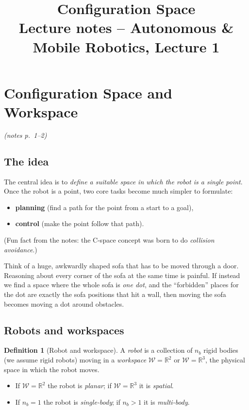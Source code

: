 \documentclass[11pt,a4paper]{article}
\title{\textbf{Configuration Space}\\[2pt]\large Lecture notes -- Autonomous \& Mobile Robotics, Lecture 1}
\author{}
\date{}
\newcommand{\R}{\mathbb{R}}
\newcommand{\W}{\mathcal{W}}
\newcommand{\pts}[1]{\emph{(notes p.~#1)}}
\theoremstyle{definition}
\newtheorem{definition}{Definition}[section]
\theoremstyle{plain}
\begin{document}
\maketitle
\tableofcontents
\bigskip


\section{Configuration Space and Workspace}\pts{1--2}

\subsection{The idea}

The central idea is to \emph{define a suitable space in which the robot is a single point}. Once the robot is a point, two core tasks become much simpler to formulate:
\begin{itemize}[nosep]
  \item \textbf{planning} (find a path for the point from a start to a goal),
  \item \textbf{control} (make the point follow that path).
\end{itemize}
(Fun fact from the notes: the C-space concept was born to do \emph{collision avoidance}.)

\begin{intuition}
Think of a huge, awkwardly shaped sofa that has to be moved through a door. Reasoning about every corner of the sofa at the same time is painful. If instead we find a space where the whole sofa is \emph{one dot}, and the ``forbidden'' places for the dot are exactly the sofa positions that hit a wall, then moving the sofa becomes moving a dot around obstacles.
\end{intuition}

\subsection{Robots and workspaces}

\begin{definition}[Robot and workspace]
A \emph{robot} is a collection of $n_b$ rigid bodies (we assume rigid robots) moving in a \emph{workspace} $\W=\R^2$ or $\W=\R^3$, the physical space in which the robot moves.
\begin{itemize}[nosep]
  \item If $\W=\R^2$ the robot is \emph{planar}; if $\W=\R^3$ it is \emph{spatial}.
  \item If $n_b=1$ the robot is \emph{single-body}; if $n_b>1$ it is \emph{multi-body}.
\end{itemize}
\end{definition}
\end{document}
